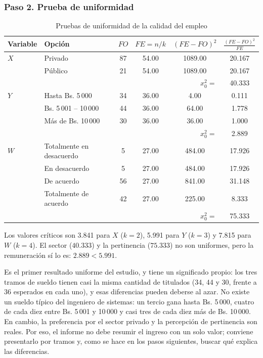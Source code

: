 \documentclass[12pt, a4paper]{article}
\newenvironment{mitabla}[2][H]{%
  \begin{table}[#1]
  \centering
  \caption{#2}
  \small
}{%
  \end{table}
}
\begin{document}
\subsubsection{Paso 2. Prueba de uniformidad}

\begin{mitabla}{Pruebas de uniformidad de la calidad del empleo}\label{tab:a3-unif}
\begin{tabular}{llcccc}
\toprule
\textbf{Variable} & \textbf{Opción} & \textbf{$FO$} & \textbf{$FE = n/k$} & \textbf{$(FE-FO)^2$} & \textbf{$\frac{(FE-FO)^2}{FE}$} \\
\midrule
$X$ & Privado & 87 & 54.00 & 1089.00 & 20.167 \\
 & Público & 21 & 54.00 & 1089.00 & 20.167 \\
 & \multicolumn{4}{r}{$x_0^2 =$} & 40.333 \\
\midrule
$Y$ & Hasta Bs. 5\,000 & 34 & 36.00 & 4.00 & 0.111 \\
 & Bs. 5\,001 -- 10\,000 & 44 & 36.00 & 64.00 & 1.778 \\
 & Más de Bs. 10\,000 & 30 & 36.00 & 36.00 & 1.000 \\
 & \multicolumn{4}{r}{$x_0^2 =$} & 2.889 \\
\midrule
$W$ & Totalmente en desacuerdo & 5 & 27.00 & 484.00 & 17.926 \\
 & En desacuerdo & 5 & 27.00 & 484.00 & 17.926 \\
 & De acuerdo & 56 & 27.00 & 841.00 & 31.148 \\
 & Totalmente de acuerdo & 42 & 27.00 & 225.00 & 8.333 \\
 & \multicolumn{4}{r}{$x_0^2 =$} & 75.333 \\
\bottomrule
\end{tabular}
\end{mitabla}

Los valores críticos son 3.841 para $X$ ($k=2$), 5.991 para $Y$ ($k=3$)
y 7.815 para $W$ ($k=4$). El sector ($40.333$) y la pertinencia
($75.333$) no son uniformes, pero la remuneración sí lo es: $2.889 <
5.991$.

Es el primer resultado uniforme del estudio, y tiene un significado
propio: los tres tramos de sueldo tienen casi la misma cantidad de
titulados (34, 44 y 30, frente a 36 esperados en cada uno), y esas
diferencias pueden deberse al azar. No existe un sueldo típico del
ingeniero de sistemas: un tercio gana hasta Bs. 5\,000, cuatro de cada
diez entre Bs. 5\,001 y 10\,000 y casi tres de cada diez más de
Bs. 10\,000. En cambio, la preferencia por el sector privado y la
percepción de pertinencia son reales. Por eso, el informe no debe
resumir el ingreso con un solo valor; conviene presentarlo por tramos y,
como se hace en los pasos siguientes, buscar qué explica las diferencias.
\end{document}
